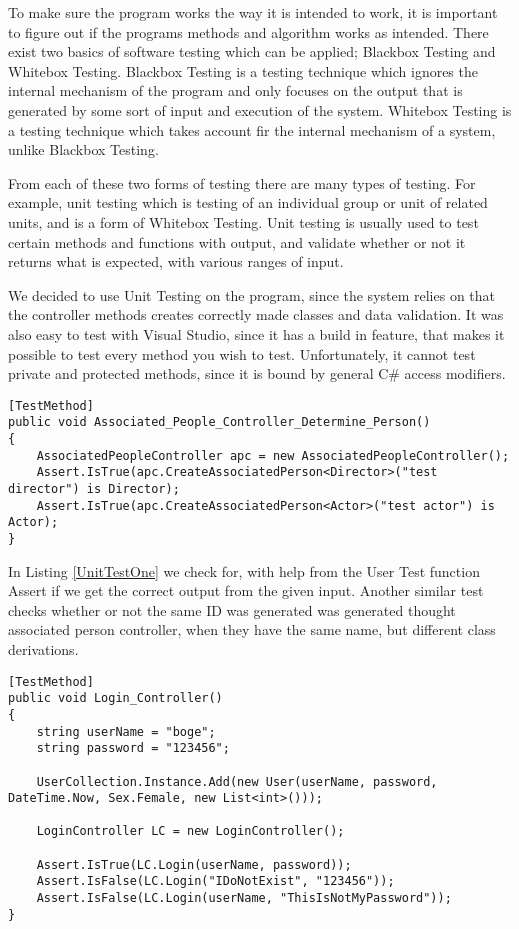 To make sure the program works the way it is intended to work, it is important to figure out if the programs methods and algorithm works as intended. There exist two basics of software testing which can be applied; Blackbox Testing and Whitebox Testing. Blackbox Testing is a testing technique which ignores the internal mechanism of the program and only focuses on the output that is generated by some sort of input and execution of the system. Whitebox Testing is a testing technique which takes account fir the internal mechanism of a system, unlike Blackbox Testing.

From each of these two forms of testing there are many types of testing. For example, unit testing which is testing of an individual group or unit of related units, and is a form of Whitebox Testing. Unit testing is usually used to test certain methods and functions with output, and validate whether or not it returns what is expected, with various ranges of input. \cite{Testing}

We decided to use Unit Testing on the program, since the system relies on that the controller methods creates correctly made classes and data validation. It was also easy to test with Visual Studio, since it has a build in feature, that makes it possible to test every method you wish to test. Unfortunately, it cannot test private and protected methods, since it is bound by general C\# access modifiers.

\begin{lstlisting}[caption={A unit test which tests the associated person controller},label={UnitTestOne}]
[TestMethod]
public void Associated_People_Controller_Determine_Person()
{
	AssociatedPeopleController apc = new AssociatedPeopleController();
	Assert.IsTrue(apc.CreateAssociatedPerson<Director>("test director") is Director);
	Assert.IsTrue(apc.CreateAssociatedPerson<Actor>("test actor") is Actor);
}
\end{lstlisting}

In Listing \ref{UnitTestOne} we check for, with help from the User Test function Assert if we get the correct output from the given input. Another similar test checks whether or not the same ID was generated was generated thought associated person controller, when they have the same name, but different class derivations.

\begin{lstlisting}[caption={A unit test which tests the login controller},label={UnitTestTwo}]
[TestMethod] 
public void Login_Controller()
{
	string userName = "boge";
	string password = "123456";

	UserCollection.Instance.Add(new User(userName, password, DateTime.Now, Sex.Female, new List<int>()));

	LoginController LC = new LoginController();

	Assert.IsTrue(LC.Login(userName, password));
	Assert.IsFalse(LC.Login("IDoNotExist", "123456"));
	Assert.IsFalse(LC.Login(userName, "ThisIsNotMyPassword"));
}
\end{lstlisting}


